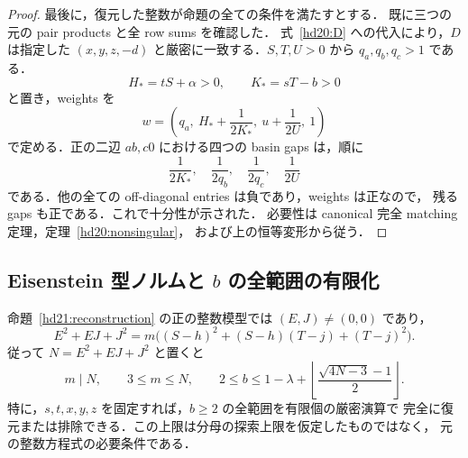 \begin{proof}
最後に，復元した整数が命題の全ての条件を満たすとする．
既に三つの元の pair products と全 row sums を確認した．
式~\eqref{hd20:D} への代入により，$D$ は指定した
$(x,y,z,-d)$ と厳密に一致する．$S,T,U>0$ から $q_a,q_b,q_c>1$ である．
\[
 H_*=tS+\alpha>0,\qquad K_*=sT-b>0
\]
と置き，weights を
\begin{equation}\label{hd21:weights}
 w=\left(q_a,\ H_*+\frac{1}{2K_*},\ u+\frac{1}{2U},\ 1\right)
\end{equation}
で定める．正の二辺 $ab,c0$ における四つの basin gaps は，順に
\[
 \frac{1}{2K_*},\quad \frac{1}{2q_b},\quad
 \frac{1}{2q_c},\quad \frac{1}{2U}
\]
である．他の全ての off-diagonal entries は負であり，weights は正なので，
残る gaps も正である．これで十分性が示された．
必要性は canonical 完全 matching 定理，定理~\ref{hd20:nonsingular}，
および上の恒等変形から従う．
\end{proof}

\subsection{Eisenstein 型ノルムと \texorpdfstring{$b$}{b} の全範囲の有限化}

\begin{theorem}[固定した五つの整数データに対する有限復元]
\label{hd21:norm-bound}
命題~\ref{hd21:reconstruction} の正の整数模型では
$(E,J)\ne(0,0)$ であり，
\begin{equation}\label{hd21:norm}
 E^2+EJ+J^2
 =m\bigl((S-h)^2+(S-h)(T-j)+(T-j)^2\bigr).
\end{equation}
従って $N=E^2+EJ+J^2$ と置くと
\begin{equation}\label{hd21:finite-bound}
 m\mid N,\qquad
 3\le m\le N,\qquad
 2\le b\le
 1-\lambda+
 \left\lfloor\frac{\sqrt{4N-3}-1}{2}\right\rfloor.
\end{equation}
特に，$s,t,x,y,z$ を固定すれば，$b\ge2$ の全範囲を有限個の厳密演算で
完全に復元または排除できる．この上限は分母の探索上限を仮定したものではなく，
元の整数方程式の必要条件である．
\end{theorem}

